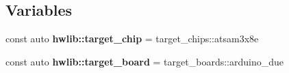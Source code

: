 \subsection*{Variables}
\begin{DoxyCompactItemize}
\item 
\mbox{\label{namespacehwlib_a38b6b0445f82e91a09a20486fd909382}} 
const auto {\bfseries hwlib\+::target\+\_\+chip} = target\+\_\+chips\+::atsam3x8e
\item 
\mbox{\label{namespacehwlib_a391d0dc84553228bf97052c74ae954af}} 
const auto {\bfseries hwlib\+::target\+\_\+board} = target\+\_\+boards\+::arduino\+\_\+due
\end{DoxyCompactItemize}
